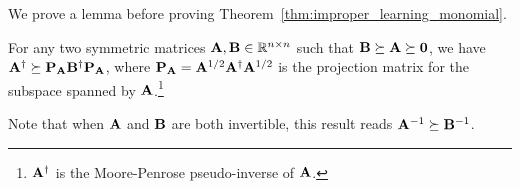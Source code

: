 
We prove a lemma before proving Theorem~\ref{thm:improper_learning_monomial}.

\begin{lem}\label{lem:inv_comparison}
For any two symmetric matrices $\mathbf{A},\mathbf{B}\in \mathbb{R}^{n\times n}$ such that $\mathbf{B}\succeq \mathbf{A}\succeq \mathbf{0}$, we have $\mathbf{A}^\dag\succeq \mathbf{P}_{\mathbf{A}} \mathbf{B}^\dag \mathbf{P}_{\mathbf{A}}$, where $\mathbf{P}_{\mathbf{A}} = \mathbf{A}^{1/2}\mathbf{A}^\dag \mathbf{A}^{1/2}$ is the projection matrix for the subspace spanned by $\mathbf{A}$.\footnote{$\mathbf{A}^\dag$ is the Moore-Penrose pseudo-inverse of $\mathbf{A}$.}

Note that when $\mathbf{A}$ and $\mathbf{B}$ are both invertible,  this result reads $\mathbf{A}^{-1}\succeq \mathbf{B}^{-1}$.
\end{lem}

